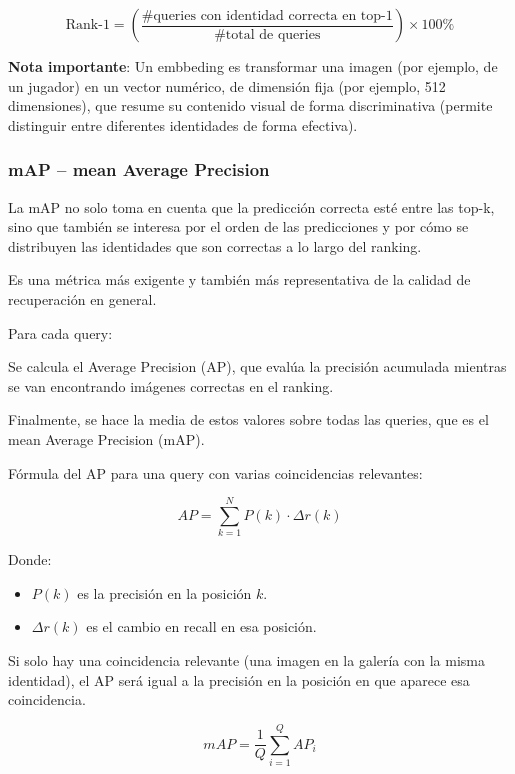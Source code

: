 \documentclass[12pt, a4paper, twoside]{article}
\begin{document}
	\begin{equation}
		\text{Rank-1} = \left( \frac{\text{\# queries con identidad correcta en top-1}}{\text{\# total de queries}} \right) \times 100\%
	\end{equation}
	
	\textbf{Nota importante}: Un embbeding es transformar una imagen (por ejemplo, de un jugador) en un vector numérico, de dimensión fija (por ejemplo, 512 dimensiones), que resume su contenido visual de forma discriminativa (permite distinguir entre diferentes identidades de forma efectiva).
	
	\subsubsection{mAP – mean Average Precision}
	
	La mAP no solo toma en cuenta que la predicción correcta esté entre las top-k, sino que también se interesa por el orden de las predicciones y por cómo se distribuyen las identidades que son correctas a lo largo del ranking.
	
	Es una métrica más exigente y también más representativa de la calidad de recuperación en general.
	
	
	Para cada query:
	
	
	Se calcula el Average Precision (AP), que evalúa la precisión acumulada mientras se van encontrando imágenes correctas en el ranking.
	
	
	Finalmente, se hace la media de estos valores sobre todas las queries, que es el mean Average Precision (mAP).
	
	
	Fórmula del AP para una query con varias coincidencias relevantes:
	
	\begin{equation}
		AP = \sum_{k=1}^N P(k) \cdot \Delta r(k)
	\end{equation}
	
	Donde:
	
	\begin{itemize}
		\item $P(k)$ es la precisión en la posición $k$.
		\item $\Delta r(k)$ es el cambio en recall en esa posición.
	\end{itemize}
	
	Si solo hay una coincidencia relevante (una imagen en la galería con la misma identidad), el AP será igual a la precisión en la posición en que aparece esa coincidencia.
	
	\begin{equation}
		mAP = \frac{1}{Q} \sum_{i=1}^{Q} AP_i
	\end{equation}
	
\end{document}
